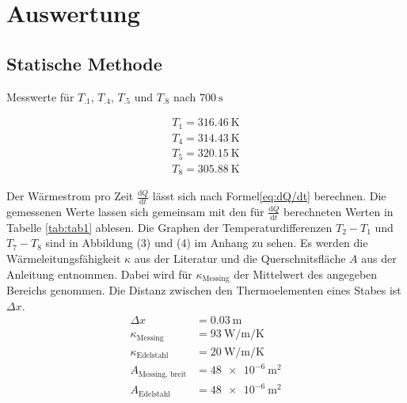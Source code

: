 \section{Auswertung}
\label{sec:Auswertung}


\subsection{Statische Methode}

Messwerte für $T_.1$, $T_.4$, $T_.5$ und $T_.8$ nach $\SI{700}{\second}$

\begin{align*}
T_\text{1}=\SI{316.46}{\kelvin}\\
T_\text{4}=\SI{314.43}{\kelvin}\\
T_\text{5}=\SI{320.15}{\kelvin}\\
T_\text{8}=\SI{305.88}{\kelvin}
\end{align*}

Der Wärmestrom pro Zeit $\frac{\mathrm{d}Q}{\mathrm{d}t}$
lässt sich nach Formel\eqref{eq:dQ/dt} berechnen. Die gemessenen Werte lassen sich gemeinsam mit den für $\frac{\mathrm{d}Q}{\mathrm{d}t}$ berechneten Werten in Tabelle \ref{tab:tab1} ablesen. Die Graphen der Temperaturdifferenzen $T_\text{2}-T_\text{1}$ und $T_\text{7}-T_\text{8}$ sind in Abbildung (3) und (4) im Anhang zu sehen.
Es werden die Wärmeleitungsfähigkeit $\kappa$ aus der Literatur\cite{kappa} und die Querschnitsfläche $A$ aus der Anleitung\cite{V204} entnommen. Dabei wird für $\kappa_\text{Messing}$ der Mittelwert des angegeben Bereichs genommen.
Die Distanz zwischen den Thermoelementen eines Stabes ist $\Delta x$.
\begin{align*}
\Delta x 			&= \SI{0.03}{\metre}\\
\kappa_\text{Messing}	&= \SI{93}{\watt\per\metre\per\kelvin}\\
\kappa_\text{Edelstahl}	&= \SI{20}{\watt\per\metre\per\kelvin}\\
A_\text{Messing, breit} 	&= \SI{ 48e-6}{\metre\squared} \\
A_\text{Edelstahl} 		&= \SI{ 48e-6}{\metre\squared}
\end{align*}

